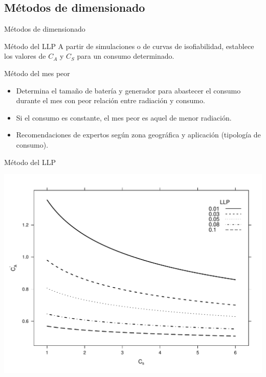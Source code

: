 \documentclass[xcolor={usenames,svgnames,dvipsnames}]{beamer}
\begin{document}
\subsection{Métodos de dimensionado}
\label{sec:org8f18734}
\begin{frame}[label={sec:org4eab097}]{Métodos de dimensionado}
\begin{block}{Método del LLP}
A partir de simulaciones o de curvas de isofiabilidad, establece los
valores de \(C_{A}\) y \(C_{S}\) para un consumo determinado.
\end{block}

\begin{block}{Método del mes peor}
\begin{itemize}
\item Determina el tamaño de batería y generador para abastecer el consumo durante el mes con peor relación entre radiación y consumo.
\item Si el consumo es constante, el mes peor es aquel de menor radiación.
\item Recomendaciones de expertos según zona geográfica y aplicación (tipología de consumo).
\end{itemize}
\end{block}
\end{frame}

\begin{frame}[label={sec:org510fc10}]{Método del LLP}
\begin{center}
\includegraphics[width=.9\linewidth]{../figs/CurvasLLP.pdf}
\end{center}
\end{frame}
\end{document}
